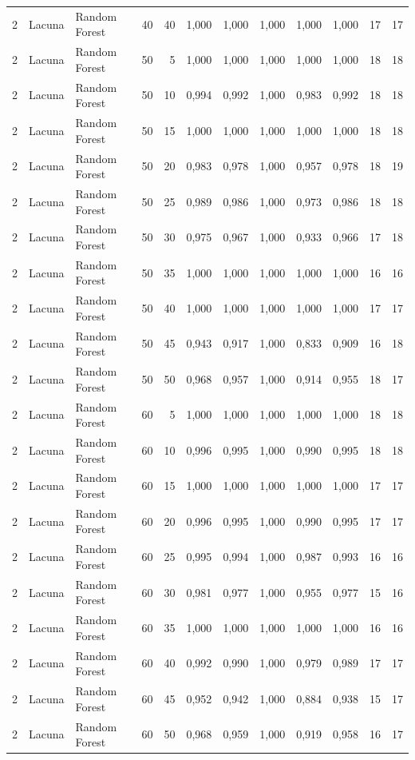 \begin{longtable}{@{}rllrrrrrrrrr@{}}
2 & Lacuna & Random Forest & 40 & 40 & 1,000 & 1,000 & 1,000 & 1,000 & 1,000 & 17 & 17 \\
2 & Lacuna & Random Forest & 50 & 5 & 1,000 & 1,000 & 1,000 & 1,000 & 1,000 & 18 & 18 \\
2 & Lacuna & Random Forest & 50 & 10 & 0,994 & 0,992 & 1,000 & 0,983 & 0,992 & 18 & 18 \\
2 & Lacuna & Random Forest & 50 & 15 & 1,000 & 1,000 & 1,000 & 1,000 & 1,000 & 18 & 18 \\
2 & Lacuna & Random Forest & 50 & 20 & 0,983 & 0,978 & 1,000 & 0,957 & 0,978 & 18 & 19 \\
2 & Lacuna & Random Forest & 50 & 25 & 0,989 & 0,986 & 1,000 & 0,973 & 0,986 & 18 & 18 \\
2 & Lacuna & Random Forest & 50 & 30 & 0,975 & 0,967 & 1,000 & 0,933 & 0,966 & 17 & 18 \\
2 & Lacuna & Random Forest & 50 & 35 & 1,000 & 1,000 & 1,000 & 1,000 & 1,000 & 16 & 16 \\
2 & Lacuna & Random Forest & 50 & 40 & 1,000 & 1,000 & 1,000 & 1,000 & 1,000 & 17 & 17 \\
2 & Lacuna & Random Forest & 50 & 45 & 0,943 & 0,917 & 1,000 & 0,833 & 0,909 & 16 & 18 \\
2 & Lacuna & Random Forest & 50 & 50 & 0,968 & 0,957 & 1,000 & 0,914 & 0,955 & 18 & 17 \\
2 & Lacuna & Random Forest & 60 & 5 & 1,000 & 1,000 & 1,000 & 1,000 & 1,000 & 18 & 18 \\
2 & Lacuna & Random Forest & 60 & 10 & 0,996 & 0,995 & 1,000 & 0,990 & 0,995 & 18 & 18 \\
2 & Lacuna & Random Forest & 60 & 15 & 1,000 & 1,000 & 1,000 & 1,000 & 1,000 & 17 & 17 \\
2 & Lacuna & Random Forest & 60 & 20 & 0,996 & 0,995 & 1,000 & 0,990 & 0,995 & 17 & 17 \\
2 & Lacuna & Random Forest & 60 & 25 & 0,995 & 0,994 & 1,000 & 0,987 & 0,993 & 16 & 16 \\
2 & Lacuna & Random Forest & 60 & 30 & 0,981 & 0,977 & 1,000 & 0,955 & 0,977 & 15 & 16 \\
2 & Lacuna & Random Forest & 60 & 35 & 1,000 & 1,000 & 1,000 & 1,000 & 1,000 & 16 & 16 \\
2 & Lacuna & Random Forest & 60 & 40 & 0,992 & 0,990 & 1,000 & 0,979 & 0,989 & 17 & 17 \\
2 & Lacuna & Random Forest & 60 & 45 & 0,952 & 0,942 & 1,000 & 0,884 & 0,938 & 15 & 17 \\
2 & Lacuna & Random Forest & 60 & 50 & 0,968 & 0,959 & 1,000 & 0,919 & 0,958 & 16 & 17 \\

\end{longtable}
